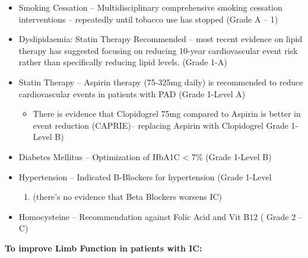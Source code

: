 \documentclass[
]{book}
\providecommand{\tightlist}{%
  \setlength{\itemsep}{0pt}\setlength{\parskip}{0pt}}
\begin{document}
\begin{itemize}
\item
  Smoking Cessation -- Multidisciplinary comprehensive smoking
  cessation interventions -- repeatedly until tobacco use has stopped
  (Grade A -- 1)
\item
  Dyslipidaemia: Statin Therapy Recommended -- most recent evidence on
  lipid therapy has suggested focusing on reducing 10-year
  cardiovascular event risk rather than specifically reducing lipid
  levels. (Grade 1-A)
\item
  Statin Therapy -- Aspirin therapy (75-325mg daily) is recommended to
  reduce cardiovascular events in patients with PAD (Grade 1-Level A)
  \citep{collaborationCollaborativeMetaanalysisRandomised2002}

  \begin{itemize}
  \tightlist
  \item
    There is evidence that Clopidogrel 75mg compared to Aspirin is
    better in event reduction
    (CAPRIE)\citep{capriesteeringcommitteeRandomisedBlindedTrial1996}--
    replacing Aspirin with Clopidogrel Grade 1-Level B)
  \end{itemize}
\item
  Diabetes Mellitus -- Optimization of HbA1C \textless{} 7\% (Grade 1-Level B)
\item
  Hypertension -- Indicated B-Blockers for hypertension (Grade 1-Level

  \begin{enumerate}
  \def\labelenumi{\Alph{enumi})}
  \setcounter{enumi}{1}
  \tightlist
  \item
    (there's no evidence that Beta Blockers worsens IC)
  \end{enumerate}
\item
  Homocysteine -- Recommendation against Folic Acid and Vit B12 (
  Grade 2 -- C)
\end{itemize}

\textbf{To improve Limb Function in patients with IC:}
\end{document}
